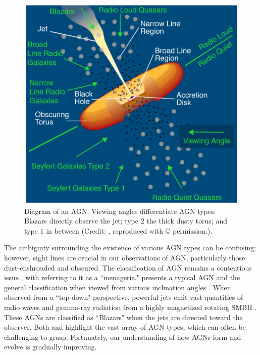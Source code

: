 \begin{figure}[t!]
    \centering
    \includegraphics[width=0.9\linewidth]{Figures/agn_diagram_cc.png}
    \caption{Diagram of an AGN. Viewing angles differentiate AGN types: Blazars directly observe the jet; type 2 the thick dusty torus; and type 1 in between (Credit: \citealp{urry_unified_1995}, reproduced with © permission.).}
    \label{Fig: AGN Diagram}
\end{figure}

The ambiguity surrounding the existence of various AGN types can be confusing; however, sight lines are crucial in our observations of AGN, particularly those dust-enshrouded and obscured. The classification of AGN remains a contentious issue \citep{padovani_active_2017}, with \cite{hickox_obscured_2018} referring to it as a ``menagerie."  presents a typical AGN and the general classification when viewed from various inclination angles \citep{urry_unified_1995}. When observed from a ``top-down" perspective, powerful jets emit vast quantities of radio waves and gamma-ray radiation from a highly magnetized rotating SMBH \citep{blandford_relativistic_2019}. These AGNs are classified as ``Blazars" when the jets are directed toward the observer. Both \cite{peterson_introduction_1997} and \cite{tadhunter_introduction_2008} highlight the vast array of AGN types, which can often be challenging to grasp. Fortunately, our understanding of how AGNs form and evolve is gradually improving.

